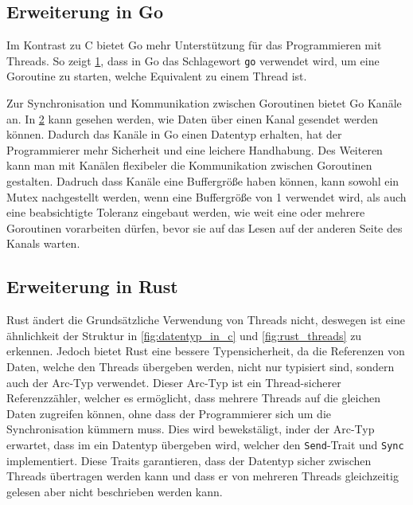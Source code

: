 \subsection{Erweiterung in Go}
\label{subsec:Erweiterung in Go}
Im Kontrast zu C bietet Go mehr Unterstützung für das Programmieren mit Threads.
So zeigt \cref{fig:goroutinen}, dass in Go das Schlagewort \texttt{go} verwendet 
wird, um eine Goroutine zu starten, welche Equivalent zu einem Thread ist.

\begin{figure}[htp]
    \centering
    
    \label{fig:goroutinen}
\end{figure}

Zur Synchronisation und Kommunikation zwischen Goroutinen bietet Go
Kanäle an. In \cref{fig:go_kanäle} kann gesehen werden, wie Daten über einen 
Kanal gesendet werden können. Dadurch das Kanäle in Go einen Datentyp erhalten,
hat der Programmierer mehr Sicherheit und eine leichere Handhabung. Des Weiteren
kann man mit Kanälen flexibeler die Kommunikation zwischen Goroutinen gestalten.
Dadruch dass Kanäle eine Buffergröße haben können, kann sowohl ein Mutex 
nachgestellt werden, wenn eine Buffergröße von 1 verwendet wird, als auch eine 
beabsichtigte Toleranz eingebaut werden, wie weit eine oder mehrere Goroutinen 
vorarbeiten dürfen, bevor sie auf das Lesen auf der anderen Seite des Kanals 
warten. \autocite{hawthorneLanguageComparisonParallel}

\begin{figure}[htp]
    \centering
    
    \label{fig:go_kanäle}
\end{figure}

\subsection{Erweiterung in Rust}
\label{subsec:Erweiterung in Rust}

Rust ändert die Grundsätzliche Verwendung von Threads nicht, deswegen ist eine 
ähnlichkeit der Struktur in \cref{fig:datentyp_in_c} und \cref{fig:rust_threads}
zu erkennen. Jedoch bietet Rust eine bessere Typensicherheit, da die Referenzen
von Daten, welche den Threads übergeben werden, nicht nur typisiert sind, sondern
auch der Arc-Typ verwendet. Dieser Arc-Typ ist ein Thread-sicherer 
Referenzzähler, welcher es ermöglicht, dass mehrere Threads auf die gleichen Daten
zugreifen können, ohne dass der Programmierer sich um die Synchronisation kümmern
muss. Dies wird bewekstäligt, inder der Arc-Typ erwartet, dass im ein Datentyp 
übergeben wird, welcher den \texttt{Send}-Trait und \texttt{Sync} implementiert. 
Diese Traits garantieren, dass der Datentyp sicher zwischen Threads 
übertragen werden kann und dass er von mehreren Threads gleichzeitig gelesen aber
nicht beschrieben werden kann.
\autocite{pfosiComparisonConcurrencyRust,IntroductionRustExample}

